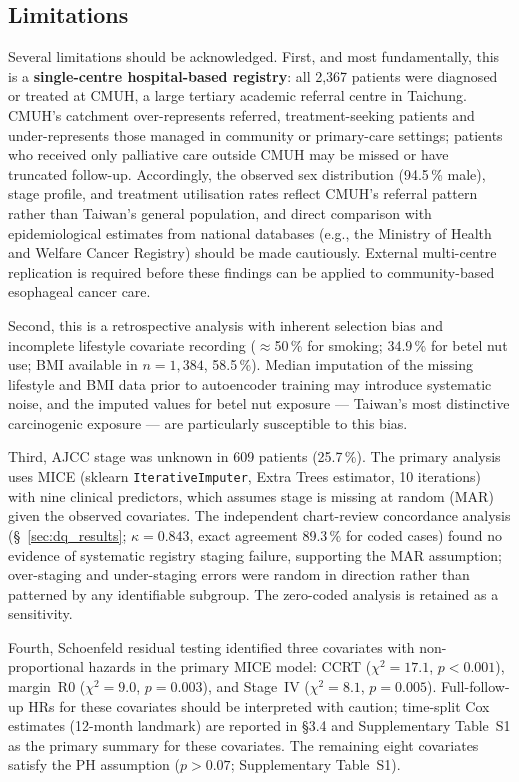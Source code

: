 \documentclass[12pt,a4paper]{article}
\begin{document}
\subsection{Limitations}
\label{sec:limitations}
Several limitations should be acknowledged. First, and most fundamentally,
this is a \textbf{single-centre hospital-based registry}: all 2,367 patients
were diagnosed or treated at CMUH, a large tertiary academic referral centre
in Taichung. CMUH's catchment over-represents referred, treatment-seeking
patients and under-represents those managed in community or primary-care
settings; patients who received only palliative care outside CMUH may be
missed or have truncated follow-up. Accordingly, the observed sex
distribution (94.5\,\% male), stage profile, and treatment utilisation rates
reflect CMUH's referral pattern rather than Taiwan's general population, and
direct comparison with epidemiological estimates from national databases
(e.g., the Ministry of Health and Welfare Cancer Registry) should be made
cautiously. External multi-centre replication is required before these
findings can be applied to community-based esophageal cancer care.

Second, this is a retrospective analysis with inherent selection bias and
incomplete lifestyle covariate recording ($\approx$50\,\% for smoking;
34.9\,\% for betel nut use; BMI available in $n = 1{,}384$, 58.5\,\%).
Median imputation of the missing lifestyle and BMI data prior to autoencoder
training may introduce systematic noise, and the imputed values for betel nut
exposure --- Taiwan's most distinctive carcinogenic exposure --- are
particularly susceptible to this bias.

Third, AJCC stage was unknown in 609 patients (25.7\,\%). The primary
analysis uses MICE (sklearn \texttt{IterativeImputer}, Extra Trees
estimator, 10 iterations) with nine clinical predictors, which assumes
stage is missing at random (MAR) given the observed covariates. The
independent chart-review concordance analysis (§~\ref{sec:dq_results};
$\kappa = 0.843$, exact agreement 89.3\,\% for coded cases) found no
evidence of systematic registry staging failure, supporting the MAR
assumption; over-staging and under-staging errors were random in direction
rather than patterned by any identifiable subgroup. The zero-coded
analysis is retained as a sensitivity.

Fourth, Schoenfeld residual testing identified three covariates with
non-proportional hazards in the primary MICE model: CCRT
($\chi^2 = 17.1$, $p < 0.001$), margin~R0 ($\chi^2 = 9.0$,
$p = 0.003$), and Stage~IV ($\chi^2 = 8.1$, $p = 0.005$).
Full-follow-up HRs for these covariates should be interpreted with
caution; time-split Cox estimates (12-month landmark) are reported in
§3.4 and Supplementary Table~S1 as the primary summary for these
covariates. The remaining eight covariates satisfy the PH assumption
($p > 0.07$; Supplementary Table~S1).
\end{document}
